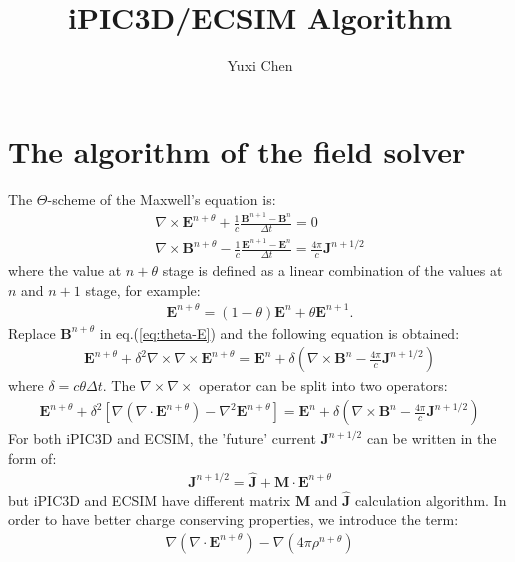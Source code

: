 \documentclass[a4paper, 11pt]{article}
\author{Yuxi Chen}
\title{iPIC3D/ECSIM Algorithm}
\begin{document}
\maketitle
\newpage

\section{The algorithm of the field solver}
The $\Theta$-scheme of the Maxwell's equation is:
\begin{eqnarray}
\nabla \times \mathbf{E}^{n+\theta} + \frac{1}{c}\frac{\mathbf{B}^{n+1}-\mathbf{B}^{n}}{\Delta t} = 0
\label{eq:theta-B}\\
\nabla \times \mathbf{B}^{n+\theta} - \frac{1}{c}\frac{\mathbf{E}^{n+1}-\mathbf{E}^{n}}{\Delta t} = \frac{4\pi}{c} \mathbf{J}^{n+1/2}
\label{eq:theta-E}
\end{eqnarray}
where the value at $n+\theta$ stage is defined as a linear combination of the values at $n$ and $n+1$ stage, for example:
\begin{eqnarray}
\mathbf{E}^{n+\theta} = (1-\theta)\mathbf{E}^{n} + \theta\mathbf{E}^{n+1}.
\label{eq:theta}
\end{eqnarray}
Replace $\mathbf{B}^{n+\theta}$ in eq.(\ref{eq:theta-E}) and the following equation is obtained:
\begin{eqnarray}
\mathbf{E}^{n+\theta} + \delta^2 \nabla \times \nabla \times \mathbf{E}^{n+\theta} = \mathbf{E}^{n} + \delta(\nabla \times \mathbf{B}^n - \frac{4\pi}{c}\mathbf{J}^{n+1/2})
\label{eq:E1}
\end{eqnarray}
where $\delta = c \theta \Delta t$. The $\nabla \times \nabla \times$ operator can be split into two operators:
\begin{eqnarray}
\mathbf{E}^{n+\theta} + \delta^2 \left[ \nabla(\nabla \cdot \mathbf{E}^{n+\theta}) - \nabla ^2 \mathbf{E}^{n+\theta}\right] = \mathbf{E}^{n} + \delta(\nabla \times \mathbf{B}^n - \frac{4\pi}{c}\mathbf{J}^{n+1/2})
\label{eq:E2}
\end{eqnarray}
For both iPIC3D and ECSIM, the 'future' current $\mathbf{J}^{n+1/2}$ can be written in the form of:
\begin{eqnarray}
\mathbf{J}^{n+1/2} = \hat{\mathbf{J}} + \mathbf{M} \cdot \mathbf{E}^{n+\theta}
\label{eq: J}
\end{eqnarray}
but iPIC3D and ECSIM have different matrix $\mathbf{M}$ and $\hat{\mathbf{J}}$ calculation algorithm.
In order to have better charge conserving properties, we introduce the term:
\begin{eqnarray}
\nabla (\nabla \cdot \mathbf{E}^{n+\theta}) - \nabla (4\pi \rho ^{n+\theta})
\label{eq:divE}
\end{eqnarray}
\end{document}
